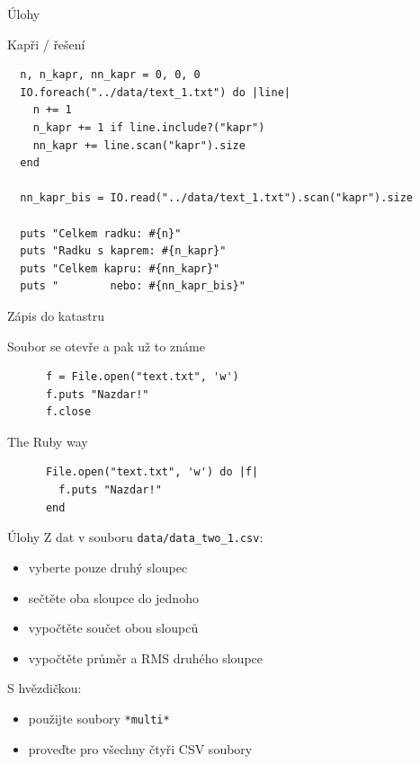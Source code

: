 \documentclass{beamer}
\begin{document}
\begin{frame}[fragile]{Úlohy}
  \begin{block}{Kapři / řešení}
    \scriptsize
\begin{verbatim}
  n, n_kapr, nn_kapr = 0, 0, 0
  IO.foreach("../data/text_1.txt") do |line|
    n += 1
    n_kapr += 1 if line.include?("kapr")
    nn_kapr += line.scan("kapr").size
  end

  nn_kapr_bis = IO.read("../data/text_1.txt").scan("kapr").size

  puts "Celkem radku: #{n}"
  puts "Radku s kaprem: #{n_kapr}"
  puts "Celkem kapru: #{nn_kapr}"
  puts "        nebo: #{nn_kapr_bis}"
\end{verbatim}
  \end{block}
\end{frame}

\begin{frame}[fragile]{Zápis do katastru}
  \begin{block}{Soubor se otevře a pak už to známe}
    \begin{verbatim}
      f = File.open("text.txt", 'w')
      f.puts "Nazdar!"
      f.close
    \end{verbatim}
  \end{block}
  \pause
  \begin{block}{The Ruby way}
    \begin{verbatim}
      File.open("text.txt", 'w') do |f|
        f.puts "Nazdar!"
      end
    \end{verbatim}
  \end{block}
\end{frame}

\begin{frame}{Úlohy}
  Z dat v souboru \texttt{data/data\_two\_1.csv}:
  \begin{itemize}
    \item vyberte pouze druhý sloupec
    \item sečtěte oba sloupce do jednoho
    \item vypočtěte součet obou sloupců
    \item vypočtěte průměr a RMS druhého sloupce
  \end{itemize}
  S hvězdičkou:
  \begin{itemize}
    \item použijte soubory \texttt{*multi*}
    \item proveďte pro všechny čtyři CSV soubory
  \end{itemize}
\end{frame}
\end{document}
